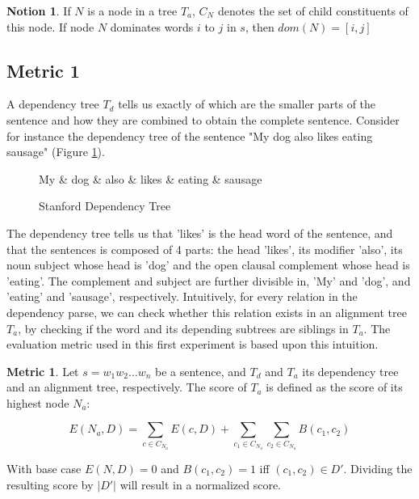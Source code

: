 \documentclass{report}
\theoremstyle{definition}
\newtheorem{metric}{Metric}
\newtheorem{notion}{Notion}
\theoremstyle{plain}
\begin{document}
\begin{notion}
If $N$ is a node in a tree $T_a$, $C_N$ denotes the set of child constituents of this node. If node $N$ dominates words $i$ to $j$ in $s$, then $dom(N)= [i,j]$
\end{notion}

\subsection{Metric 1}

A dependency tree $T_d$ tells us exactly of which are the smaller parts of the sentence and how they are combined to obtain the complete sentence. Consider for instance the dependency tree of the sentence "My dog also likes eating sausage" (Figure \ref{fig:deptree1}).

\begin{figure}[!h]\label{fig:deptree1}
\centering
\begin{dependency}[theme=simple]%
\begin{deptext}[column sep=.5cm, row sep=.1ex]
My \& dog \& also \& likes \& eating \& sausage \\
\end{deptext}
\end{dependency}
\caption{Stanford Dependency Tree}
\end{figure}

\noindent The dependency tree tells us that 'likes' is the head word of the sentence, and that the sentences is composed of 4 parts: the head 'likes', its modifier 'also', its noun subject whose head is 'dog' and the open clausal complement whose head is 'eating'. The complement and subject are further divisible in, 'My' and 'dog', and 'eating' and 'sausage', respectively. Intuitively, for every relation in the dependency parse, we can check whether this relation exists in an alignment tree $T_a$, by checking if the word and its depending subtrees are siblings in $T_a$. The evaluation metric used in this first experiment is based upon this intuition.

\begin{metric}\label{m1}
Let $s = w_1 w_2 \dots w_n$ be a sentence, and $T_d$ and $T_a$ its dependency tree and an alignment tree, respectively. The score of $T_a$ is defined as the score of its highest node $N_{a}$:

$$
E(N_a,D) = \sum_{c\in C_{N_a}} E(c,D)+ \sum_{c_1\in C_{N_a}} \sum_{c_2\in C_{N_a}} B(c_1,c_2)
$$

\noindent With base case $E(N,D) = 0$ and $B(c_1,c_2) = 1$ iff  $(c_1,c_2)\in D'$. Dividing the resulting score by $|D'|$ will result in a normalized score.
\end{metric}
\end{document}
